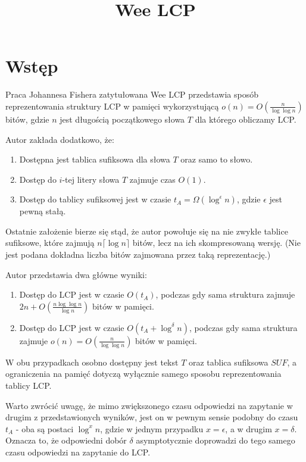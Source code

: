 \documentclass{article}
\title{Wee LCP}
\date{}
\begin{document}
\maketitle

\section{Wstęp}

Praca Johannesa Fishera zatytułowana Wee LCP przedstawia sposób reprezentowania struktury LCP w pamięci wykorzystującą $o(n) = O(\frac{n}{\log{\log{n}}})$ bitów, gdzie $n$ jest długością początkowego słowa $T$ dla którego obliczamy LCP.

Autor zakłada dodatkowo, że:
\begin{enumerate}
    \item Dostępna jest tablica sufiksowa dla słowa $T$ oraz samo to słowo.
    \item Dostęp do $i$-tej litery słowa $T$ zajmuje czas $O(1)$.
    \item Dostęp do tablicy sufiksowej jest w czasie $t_A = \Omega(\log^{\epsilon}{n})$, gdzie $\epsilon$ jest pewną stałą.
\end{enumerate}
Ostatnie założenie bierze się stąd, że autor powołuje się na nie zwykłe tablice sufiksowe, które zajmują $n \lceil \log{n} \rceil$ bitów, lecz na ich skompresowaną wersję. (Nie jest podana dokładna liczba bitów zajmowana przez taką reprezentację.)

Autor przedstawia dwa główne wyniki:
\begin{enumerate}
    \item Dostęp do LCP jest w czasie $O(t_A)$, podczas gdy sama struktura zajmuje $2n + O(\frac{n \log\log{n}}{\log{n}})$ bitów w pamięci.
    \item Dostęp do LCP jest w czasie $O(t_A + \log^{\delta}{n})$, podczas gdy sama struktura zajmuje $o(n) = O(\frac{n}{\log{\log{n}}})$ bitów w pamięci.
\end{enumerate}

W obu przypadkach osobno dostępny jest tekst $T$ oraz tablica sufiksowa $SUF$, a ograniczenia na pamięć dotyczą wyłącznie samego sposobu reprezentowania tablicy LCP.

Warto zwrócić uwagę, że mimo zwiększonego czasu odpowiedzi na zapytanie w drugim z przedstawionych wyników, jest on w pewnym sensie podobny do czasu $t_A$ - oba są postaci $\log^x{n}$, gdzie w jednym przypadku $x = \epsilon$, a w drugim $x = \delta$. Oznacza to, że odpowiedni dobór $\delta$ asymptotycznie doprowadzi do tego samego czasu odpowiedzi na zapytanie do LCP.
\end{document}
